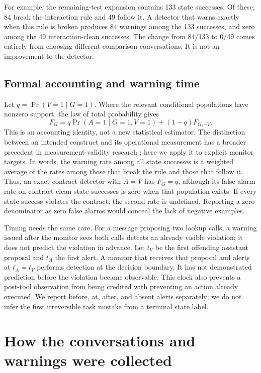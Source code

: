 For example, the remaining-test expansion contains 133 state successes. Of these, 84 break the interaction rule and 49 follow it. A detector that warns exactly when this rule is broken produces 84 warnings among the 133 successes, and zero among the 49 interaction-clean successes. The change from 84/133 to 0/49 comes entirely from choosing different comparison conversations. It is not an improvement to the detector.

\subsection{Formal accounting and warning time}
Let $q=\Pr(V=1\mid G=1)$. Where the relevant conditional populations have nonzero support, the law of total probability gives
\begin{equation}
 F_G=q\Pr(A=1\mid G=1,V=1)+(1-q)F_{G,\neg V}.
 \label{eq:decomposition}
\end{equation}
This is an accounting identity, not a new statistical estimator. The distinction between an intended construct and its operational measurement has a broader precedent in measurement-validity research \citep{jacobs2021measurement}; here we apply it to explicit monitor targets. In words, the warning rate among all state successes is a weighted average of the rates among those that break the rule and those that follow it. Thus, an exact contract detector with $A=V$ has $F_G=q$, although its false-alarm rate on contract-clean state successes is zero when that population exists. If every state success violates the contract, the second rate is undefined. Reporting a zero denominator as zero false alarms would conceal the lack of negative examples.

Timing needs the same care. For a message proposing two lookup calls, a warning issued after the monitor sees both calls detects an already visible violation; it does not predict the violation in advance. Let $t_V$ be the first offending assistant proposal and $t_A$ the first alert. A monitor that receives that proposal and alerts at $t_A=t_V$ performs detection at the decision boundary. It has not demonstrated prediction before the violation became observable. This clock also prevents a post-tool observation from being credited with preventing an action already executed. We report before, at, after, and absent alerts separately; we do not infer the first irreversible task mistake from a terminal state label.

\section{How the conversations and warnings were collected}
\label{sec:protocol}
